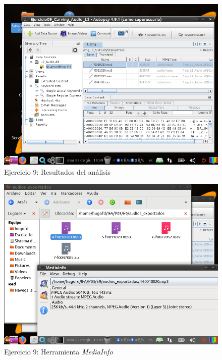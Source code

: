 \documentclass[11pt]{article}
\begin{document}
\begin{figure}[H]
    \caption{Ejercicio 9: Resultados del análisis}
    \centering
    \includegraphics[scale=0.7]{e9-5.png}
\end{figure}

\begin{figure}[H]
    \caption{Ejercicio 9: Herramienta \textit{MediaInfo}}
    \centering
    \includegraphics[scale=0.7]{e9-6.png}
\end{figure}
\end{document}
